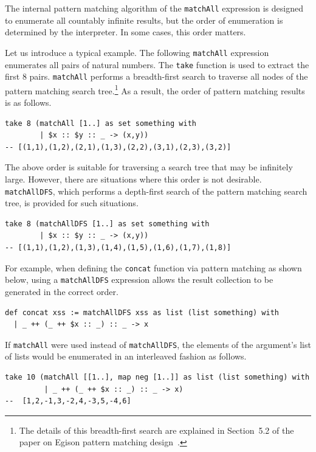 The internal pattern matching algorithm of the \lstinline{matchAll} expression is designed to enumerate all countably infinite results,
but the order of enumeration is determined by the interpreter.
In some cases, this order matters.

Let us introduce a typical example.
The following \lstinline{matchAll} expression enumerates all pairs of natural numbers.
The \lstinline{take} function is used to extract the first $8$ pairs.
\lstinline{matchAll} performs a breadth-first search to traverse all nodes of the pattern matching search tree.\footnote{The details of this breadth-first search are explained in Section~5.2 of the paper on Egison pattern matching design~\cite{egi2018Aplas}.}
As a result, the order of pattern matching results is as follows.
\begin{lstlisting}[language=egison,numbers=none]
take 8 (matchAll [1..] as set something with
        | $x :: $y :: _ -> (x,y))
-- [(1,1),(1,2),(2,1),(1,3),(2,2),(3,1),(2,3),(3,2)]
\end{lstlisting}
The above order is suitable for traversing a search tree that may be infinitely large.
However, there are situations where this order is not desirable.
\lstinline{matchAllDFS}, which performs a depth-first search of the pattern matching search tree, is provided for such situations.
\begin{lstlisting}[language=egison,numbers=none]
take 8 (matchAllDFS [1..] as set something with
        | $x :: $y :: _ -> (x,y))
-- [(1,1),(1,2),(1,3),(1,4),(1,5),(1,6),(1,7),(1,8)]
\end{lstlisting}
For example, when defining the \lstinline{concat} function via pattern matching as shown below, using a \lstinline{matchAllDFS} expression allows the result collection to be generated in the correct order.
\begin{lstlisting}[language=egison,numbers=none]
def concat xss := matchAllDFS xss as list (list something) with
  | _ ++ (_ ++ $x :: _) :: _ -> x
\end{lstlisting}
If \lstinline{matchAll} were used instead of \lstinline{matchAllDFS}, the elements of the argument's list of lists would be enumerated in an interleaved fashion as follows.
\begin{lstlisting}[language=egison,numbers=none]
take 10 (matchAll [[1..], map neg [1..]] as list (list something) with
         | _ ++ (_ ++ $x :: _) :: _ -> x)
--  [1,2,-1,3,-2,4,-3,5,-4,6]
\end{lstlisting}


